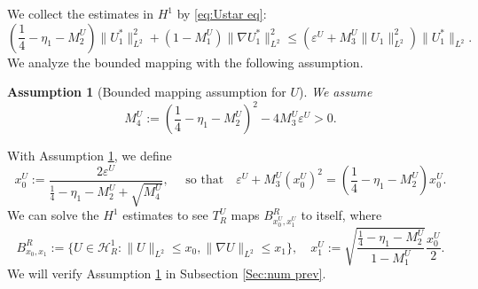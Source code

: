 \documentclass[11pt,a4paper]{article}
\numberwithin{equation}{section}
\newcommand{\assign}{:=}
\newtheorem{assumption}{Assumption}
\begin{document}
     We collect the estimates in $H^1$ by \eqref{eq:Ustar eq}: 
  \begin{equation*}
  ( \frac{1}{4} - \eta_1 - M_2^U ) \| U_1^{\ast}
  \|_{L^2}^2 + (1 - M_1^U) \| \nabla U_1^{\ast} \|_{L^2}^2 \leqslant  (\varepsilon^U+M_3^U \|  U_1 \|_{L^2}^2)\| U_1^{\ast} \|_{L^2}. \label{eq:final est}
\end{equation*} We analyze the bounded mapping with the following assumption.
\begin{assumption}[Bounded mapping assumption for $U$]\label{eq:cond ref U}
    We assume\begin{equation*}
    M_4^U\assign( \frac{1}{4} - \eta_1 - M_2^U )^2 - 4M_3^U \varepsilon^U > 0. 
  \end{equation*}
\end{assumption}
  With Assumption \ref{eq:cond ref U}, we define $$x_0^U \assign \frac{2 \varepsilon^U}{\frac{1}{4} - \eta_1 - M_2^U + \sqrt{ M_4^U}}, \quad\text{ so that}\quad \varepsilon^U+M_3^U (x_0^U)^2=(\frac{1}{4} - \eta_1 - M_2^U )x_0^U.$$  We can solve the $H^1$ estimates to see $T_R^U$ maps $B^R_{x_0^U, x_1^U}$ to itself, where
  \[ B^R_{x_0, x_1} \assign \{ U \in \mathcal{H}^1_R: \| U \|_{L^2} \leqslant x_0, \| \nabla U
     \|_{L^2} \leqslant x_1 \} ,\quad x_1^U \assign \sqrt{\frac{\frac{1}{4} - \eta_1 - M_2^U}{1 - M_1^U}} \frac{x_0^U}{2}. \]
We will verify Assumption \ref{eq:cond ref U} in Subsection \ref{Sec:num prev}.
\end{document}
